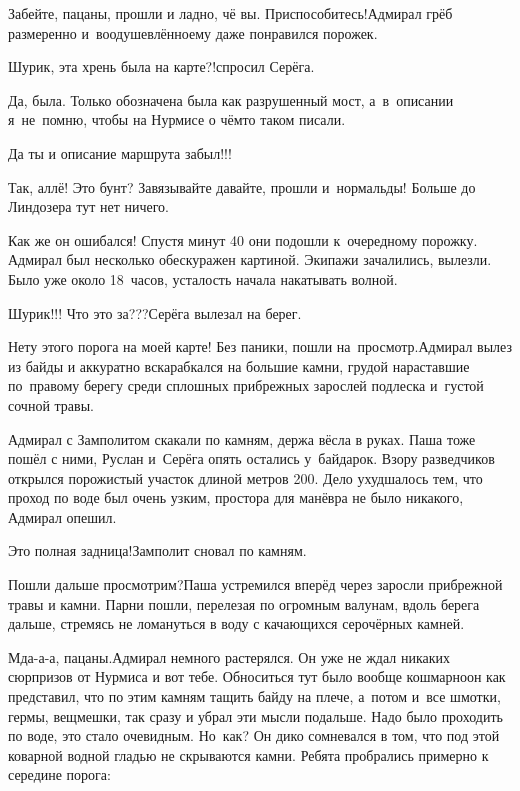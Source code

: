 \diagdash Забейте, пацаны, прошли и ладно, чё вы. Приспособитесь!\mdash Адмирал грёб размеренно и~воодушевлённо\mdash ему даже понравился порожек.

\diagdash Шурик, эта хрень была на карте?!\mdash спросил Серёга.

\diagdash Да, была. Только обозначена была как разрушенный мост, а~в~описании я~не~помню, чтобы на Нурмисе о чём\sdash то таком писали.

\diagdash Да ты и описание маршрута забыл!!!

\diagdash Так, аллё! Это бунт? Завязывайте давайте, прошли и~нормальды! Больше до Линдозера тут нет ничего.

Как же он ошибался! Спустя минут 40 они подошли к~очередному порожку. Адмирал был несколько обескуражен картиной. Экипажи зачалились, вылезли. Было уже около 18~часов, усталость начала накатывать волной.

\diagdash Шурик!!! Что это за???\mdash Серёга вылезал на берег.

\diagdash Нету этого порога на моей карте! Без паники, пошли на~просмотр.\mdash Адмирал вылез из байды и аккуратно вскарабкался на большие камни, грудой нараставшие по~правому берегу среди сплошных прибрежных зарослей подлеска и~густой сочной травы.

Адмирал с Замполитом скакали по камням, держа вёсла в руках. Паша тоже пошёл с ними, Руслан и~Серёга опять остались у~байдарок. Взору разведчиков открылся порожистый участок длиной метров 200. Дело ухудшалось тем, что проход по воде был очень узким, простора для манёвра не было никакого, Адмирал опешил.

\diagdash Это полная задница!\mdash Замполит сновал по камням.

\diagdash Пошли дальше просмотрим?\mdash Паша устремился вперёд через заросли прибрежной травы и камни. Парни пошли, перелезая по огромным валунам, вдоль берега дальше, стремясь не ломануться в воду с качающихся серо\sdash чёрных камней.

\diagdash Мда-а-а, пацаны.\mdash Адмирал немного растерялся. Он уже не ждал никаких сюрпризов от Нурмиса и вот тебе. Обноситься тут было вообще кошмарно\mdash он как представил, что по этим камням тащить байду на плече, а~потом и~все шмотки, гермы, вещмешки, так сразу и убрал эти мысли подальше. Надо было проходить по воде, это стало очевидным. Но~как? Он дико сомневался в том, что под этой коварной водной гладью не скрываются камни. Ребята пробрались примерно к середине порога:

